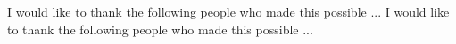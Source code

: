 \documentclass[12 pt]{report}
\begin{document}
\noindent I would like to thank the following people who made this possible ...
I would like to thank the following people who made this possible ...


\tableofcontents

\listoftables

\listoffigures


\acknowledgementspage

\abstractpage


%
%
%
%
\startofchapters


%
%
%

\appendix
\appendixeqnumbering









\end{document}
